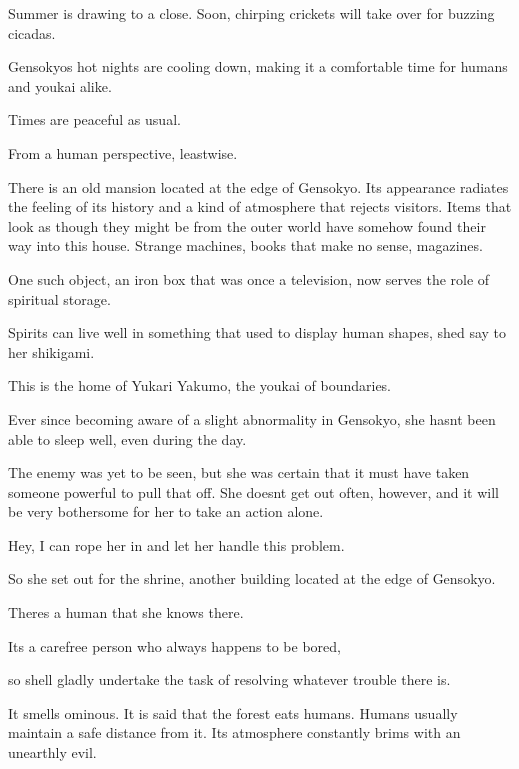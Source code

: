 \begin{tcolorbox}[breakable, colback=white, colframe=black!80,
  boxrule=0.6pt, arc=0mm, left=3mm, right=3mm, top=2mm, bottom=2mm]
\ttfamily\small\raggedright
Summer is drawing to a close. Soon, chirping crickets will take over for buzzing cicadas.\par
Gensokyo\textquotesingle{}s hot nights are cooling down, making it a comfortable time for humans and youkai alike.\par
Times are peaceful as usual.\par
From a human perspective, leastwise.\par
\medskip
\medskip
There is an old mansion located at the edge of Gensokyo. Its appearance radiates the feeling of its history and a kind of atmosphere that rejects visitors. Items that look as though they might be from the outer world have somehow found their way into this house. Strange machines, books that make no sense, magazines.\par
One such object, an iron box that was once a television, now serves the role of spiritual storage.\par
\textquotedbl{}Spirits can live well in something that used to display human shapes,\textquotedbl{} she\textquotesingle{}d say to her shikigami.\par
This is the home of Yukari Yakumo, the youkai of boundaries.\par
Ever since becoming aware of a slight abnormality in Gensokyo, she hasn\textquotesingle{}t been able to sleep well, even during the day.\par
The enemy was yet to be seen, but she was certain that it must have taken someone powerful to pull that off. She doesn\textquotesingle{}t get out often, however, and it will be very bothersome for her to take an action alone.\par
\textquotedbl{}Hey, I can rope her in and let her handle this problem.\textquotedbl{}\par
So she set out for the shrine, another building located at the edge of Gensokyo.\par
There\textquotesingle{}s a human that she knows there.\par
It\textquotesingle{}s a carefree person who always happens to be bored,\par
so she\textquotesingle{}ll gladly undertake the task of resolving whatever trouble there is.\par
\medskip
\medskip
It smells ominous. It is said that the forest eats humans. Humans usually maintain a safe distance from it. Its atmosphere constantly brims with an unearthly evil.\par

\end{tcolorbox}
